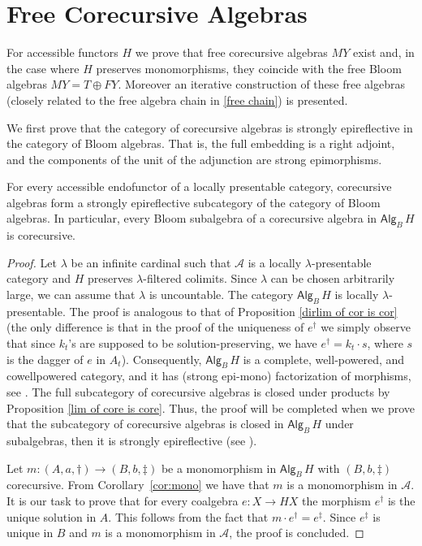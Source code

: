 \documentclass{LMCS}
\theoremstyle{plain}
\theoremstyle{definition}
\numberwithin{equation}{section}
\begin{document}
\section{Free Corecursive Algebras}
\label{sec:4}

For accessible functors $H$ we prove that free corecursive algebras $MY$ exist and, in the case where $H$ preserves monomorphisms, they coincide with the free Bloom algebras $MY=T\oplus FY$. Moreover an iterative construction of these free algebras (closely related to the free algebra chain in \ref{free chain}) is presented.

We first prove that the category of corecursive algebras is strongly epireflective in the category of Bloom algebras. That is, the full embedding is a right adjoint, and the components of the unit of the adjunction are strong epimorphisms.


\begin{prop}\label{cor reflected of B}
For every accessible endofunctor of  a locally presentable category, corecursive algebras form a strongly epireflective subcategory of the category of Bloom algebras. In particular, every Bloom subalgebra of a corecursive algebra in $\mathsf{Alg}_B\, H$ is corecursive.
\end{prop}

\begin{proof}
Let $\lambda$ be an infinite cardinal such that $\mathcal A$ is a
locally $\lambda$-presentable category and $H$ preserves
$\lambda$-filtered colimits. Since $\lambda $ can be chosen
arbitrarily large, we can assume that $\lambda$ is uncountable. The
category $\mathsf{Alg}_B\, H$ is locally $\lambda$-presentable. The
proof is analogous to that of Proposition \ref{dirlim of cor is cor}
(the only difference is that in the proof of the uniqueness of
$e^\dagger$ we simply observe that since $k_t$'s are supposed to be
solution-preserving, we have $e^\dagger =k_t\cdot s$, where $s$ is the
dagger of $e$ in $A_t$). Consequently, $\mathsf{Alg}_B\,H$ is a
complete, well-powered, and cowellpowered category, and it has (strong
epi-mono) factorization of morphisms, see \cite{ar}. The full
subcategory of corecursive algebras is closed under products by
Proposition \ref{lim of core is core}. Thus, the proof will be
completed when we prove that the subcategory of  corecursive algebras
is closed in $\mathsf{Alg}_B\,H$ under subalgebras, then it is
strongly epireflective (see \cite[Theorem~16.8]{ahs}).

Let $m:(A,a,\dagger)\rightarrow (B,b,\ddag)$ be a monomorphism in
$\mathsf{Alg}_B\,H$ with $(B,b,\ddag)$ corecursive. From Corollary~\ref{cor:mono} we have that $m$ is a monomorphism in $\mathcal A$. It is our task to prove that for every coalgebra $e:X\rightarrow HX$ the morphism $e^\dagger$ is the unique solution in $A$. This follows from the fact that $m\cdot e^\dagger=e^\ddag$. Since $e^\ddag$ is unique in $B$ and $m$ is a monomorphism in $\mathcal A$, the proof is concluded.
\end{proof}
\end{document}
